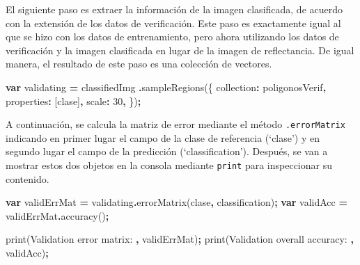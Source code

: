 \documentclass[
  12pt,
  letterpaper,
  twoside]{book}
\newenvironment{Shaded}{\begin{snugshade}}{\end{snugshade}}
\newcommand{\DataTypeTok}[1]{\textcolor[rgb]{0.13,0.29,0.53}{#1}}
\newcommand{\DecValTok}[1]{\textcolor[rgb]{0.00,0.00,0.81}{#1}}
\newcommand{\FunctionTok}[1]{\textcolor[rgb]{0.00,0.00,0.00}{#1}}
\newcommand{\KeywordTok}[1]{\textcolor[rgb]{0.13,0.29,0.53}{\textbf{#1}}}
\newcommand{\NormalTok}[1]{#1}
\newcommand{\OperatorTok}[1]{\textcolor[rgb]{0.81,0.36,0.00}{\textbf{#1}}}
\newcommand{\StringTok}[1]{\textcolor[rgb]{0.31,0.60,0.02}{#1}}
\begin{document}
El siguiente paso es extraer la información de la imagen clasificada, de acuerdo con la extensión de los datos de verificación. Este paso es exactamente igual al que se hizo con los datos de entrenamiento, pero ahora utilizando los datos de verificación y la imagen clasificada en lugar de la imagen de reflectancia. De igual manera, el resultado de este paso es una colección de vectores.

\begin{Shaded}
\begin{Highlighting}[]
\KeywordTok{var}\NormalTok{ validating }\OperatorTok{=}\NormalTok{ classifiedImg}
  \OperatorTok{.}\FunctionTok{sampleRegions}\NormalTok{(\{}
  \DataTypeTok{collection}\OperatorTok{:}\NormalTok{ poligonosVerif}\OperatorTok{,}
  \DataTypeTok{properties}\OperatorTok{:}\NormalTok{ [}\StringTok{\textquotesingle{}clase\textquotesingle{}}\NormalTok{]}\OperatorTok{,}
  \DataTypeTok{scale}\OperatorTok{:} \DecValTok{30}\OperatorTok{,}
\NormalTok{\})}\OperatorTok{;}
\end{Highlighting}
\end{Shaded}

A continuación, se calcula la matriz de error mediante el método \texttt{.errorMatrix} indicando en primer lugar el campo de la clase de referencia (`clase') y en segundo lugar el campo de la predicción (`classification'). Después, se van a mostrar estos dos objetos en la consola mediante \texttt{print} para inspeccionar su contenido.

\begin{Shaded}
\begin{Highlighting}[]
\KeywordTok{var}\NormalTok{ validErrMat }\OperatorTok{=}\NormalTok{ validating}\OperatorTok{.}\FunctionTok{errorMatrix}\NormalTok{(}\StringTok{\textquotesingle{}clase\textquotesingle{}}\OperatorTok{,} \StringTok{\textquotesingle{}classification\textquotesingle{}}\NormalTok{)}\OperatorTok{;}
\KeywordTok{var}\NormalTok{ validAcc }\OperatorTok{=}\NormalTok{ validErrMat}\OperatorTok{.}\FunctionTok{accuracy}\NormalTok{()}\OperatorTok{;}

\FunctionTok{print}\NormalTok{(}\StringTok{\textquotesingle{}Validation error matrix: \textquotesingle{}}\OperatorTok{,}\NormalTok{ validErrMat)}\OperatorTok{;}
\FunctionTok{print}\NormalTok{(}\StringTok{\textquotesingle{}Validation overall accuracy: \textquotesingle{}}\OperatorTok{,}\NormalTok{ validAcc)}\OperatorTok{;}
\end{Highlighting}
\end{Shaded}
\end{document}

